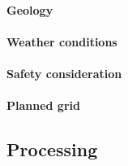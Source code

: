 \paragraph{Geology}

\paragraph{Weather conditions}

\paragraph{Safety consideration}

\paragraph{Planned grid}


\subsection{Processing}